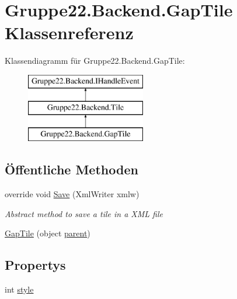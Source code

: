 \hypertarget{class_gruppe22_1_1_backend_1_1_gap_tile}{\section{Gruppe22.\-Backend.\-Gap\-Tile Klassenreferenz}
\label{class_gruppe22_1_1_backend_1_1_gap_tile}
}
Klassendiagramm für Gruppe22.\-Backend.\-Gap\-Tile\-:\begin{figure}[H]
\begin{center}
\leavevmode
\includegraphics[height=3.000000cm]{class_gruppe22_1_1_backend_1_1_gap_tile}
\end{center}
\end{figure}
\subsection*{Öffentliche Methoden}
\begin{DoxyCompactItemize}
\item 
override void \hyperlink{class_gruppe22_1_1_backend_1_1_gap_tile_aeeed4e7d3d3d230ba20398bee17f4ed2}{Save} (Xml\-Writer xmlw)
\begin{DoxyCompactList}\small\item\em Abstract method to save a tile in a X\-M\-L file \end{DoxyCompactList}\item 
\hyperlink{class_gruppe22_1_1_backend_1_1_gap_tile_a6ae54dae7bf37a807d01e7c449b43e2c}{Gap\-Tile} (object \hyperlink{class_gruppe22_1_1_backend_1_1_tile_abc12933c70eb3a2ebbb2fde9f45c2632}{parent})
\end{DoxyCompactItemize}
\subsection*{Propertys}
\begin{DoxyCompactItemize}
\item 
int \hyperlink{class_gruppe22_1_1_backend_1_1_gap_tile_a2833c0484bcea6f07f1643bb44137116}{style}
\end{DoxyCompactItemize}
